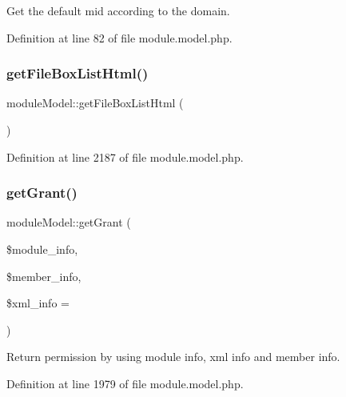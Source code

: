 Get the default mid according to the domain. 



Definition at line 82 of file module.\+model.\+php.

\hypertarget{classmoduleModel_acf3405bfe791d8bf7d8e7886b9481923}{}\label{classmoduleModel_acf3405bfe791d8bf7d8e7886b9481923} 
\subsubsection{\texorpdfstring{get\+File\+Box\+List\+Html()}{getFileBoxListHtml()}}
{\footnotesize\ttfamily module\+Model\+::get\+File\+Box\+List\+Html (\begin{DoxyParamCaption}{ }\end{DoxyParamCaption})}



Definition at line 2187 of file module.\+model.\+php.

\hypertarget{classmoduleModel_a7ed08b703723a21e4d81b4aa89947264}{}\label{classmoduleModel_a7ed08b703723a21e4d81b4aa89947264} 
\subsubsection{\texorpdfstring{get\+Grant()}{getGrant()}}
{\footnotesize\ttfamily module\+Model\+::get\+Grant (\begin{DoxyParamCaption}\item[{}]{\$module\+\_\+info,  }\item[{}]{\$member\+\_\+info,  }\item[{}]{\$xml\+\_\+info = {\ttfamily \textquotesingle{}\textquotesingle{}} }\end{DoxyParamCaption})}



Return permission by using module info, xml info and member info. 



Definition at line 1979 of file module.\+model.\+php.

\hypertarget{classmoduleModel_a4ea7187b04b26a98fe6d7fd138817b16}{}\label{classmoduleModel_a4ea7187b04b26a98fe6d7fd138817b16} 
